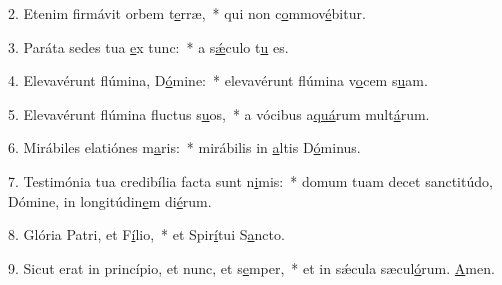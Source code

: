 2. Etenim firmávit orbem t\uline{e}rræ,~* qui non c\uline{o}mmov\uline{é}bitur.\par 
3. Paráta sedes tua \uline{e}x tunc:~* a s\uline{ǽ}culo t\uline{u} es.\par 
4. Elevavérunt flúmina, D\uline{ó}mine:~* elevavérunt flúmina v\uline{o}cem s\uline{u}am.\par 
5. Elevavérunt flúmina fluctus s\uline{u}os,~* a vócibus a\uline{quá}rum mult\uline{á}rum.\par 
6. Mirábiles elatiónes m\uline{a}ris:~* mirábilis in \uline{a}ltis D\uline{ó}minus.\par 
7. Testimónia tua credibília facta sunt n\uline{i}mis:~* domum tuam decet sanctitúdo, Dómine, in longitúdin\uline{e}m di\uline{é}rum.\par 
8. Glória Patri, et F\uline{í}lio,~* et Spir\uline{í}tui S\uline{a}ncto.\par 
9. Sicut erat in princípio, et nunc, et s\uline{e}mper,~* et in sǽcula sæcul\uline{ó}rum. \uline{A}men.\par 

